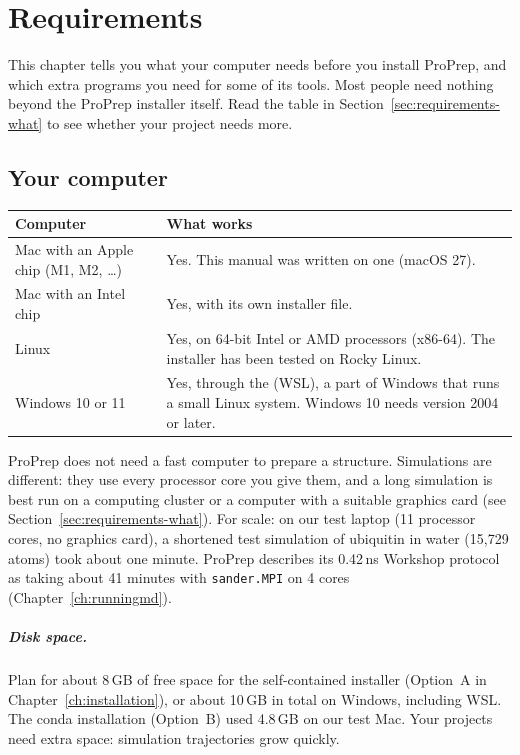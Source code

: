 \chapter{Requirements}
\label{ch:requirements}

This chapter tells you what your computer needs before you install ProPrep,
and which extra programs you need for some of its tools. Most people need
nothing beyond the ProPrep installer itself. Read the table in
Section~\ref{sec:requirements-what} to see whether your project needs more.

\section{Your computer}
\label{sec:requirements-computer}

\begin{tabularx}{\linewidth}{@{}lL@{}}
\toprule
\textbf{Computer} & \textbf{What works} \\
\midrule
Mac with an Apple chip (M1, M2, \ldots) & Yes. This manual was written on one
(macOS 27). \\
Mac with an Intel chip & Yes, with its own installer file. \\
Linux & Yes, on 64-bit Intel or AMD processors (x86-64). The installer has
been tested on Rocky Linux. \\
Windows 10 or 11 & Yes, through the  (WSL),
a part of Windows that runs a small Linux system. Windows 10 needs version
2004 or later. \\
\bottomrule
\end{tabularx}

\medskip
ProPrep does not need a fast computer to prepare a structure. Simulations are
different: they use every processor core you give them, and a long simulation
is best run on a computing cluster or a computer with a suitable graphics card
(see Section~\ref{sec:requirements-what}). For scale: on our test laptop
(11 processor cores, no graphics card), a shortened test simulation of
ubiquitin in water (15,729 atoms) took about one minute. ProPrep describes its
0.42\,ns Workshop protocol as taking about 41 minutes with \texttt{sander.MPI}
on 4 cores (Chapter~\ref{ch:runningmd}).

\paragraph{Disk space.} Plan for about 8\,GB of free space for the
self-contained installer (Option~A in Chapter~\ref{ch:installation}), or
about 10\,GB in total on Windows, including WSL. The conda installation
(Option~B) used 4.8\,GB on our test Mac. Your projects need extra space:
simulation trajectories grow quickly.

